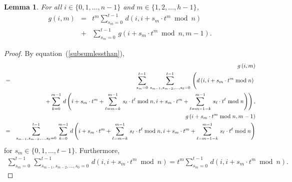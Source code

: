 \documentclass[letterpaper,12pt]{article}
\newtheorem{lemma}[theorem]{Lemma}
\begin{document}
\begin{lemma}
\label{recurrencelemma1}
For all $i\in\{0,1,\ldots,n-1\}$ and $m\in\{1,2,\ldots,h-1\}$,
\begin{eqnarray}
g\left(i,m
\right)
&=&
t^m\sum_{s_m=0}^{t-1}\,
d\left(i,i+s_m\cdot t^m\bmod{n}\right)\nonumber\\
&+&\sum_{s_m=0}^{t-1}\,
g\left(i+s_m\cdot t^m\bmod{n},m-1
\right).
\nonumber
\end{eqnarray}
\end{lemma}
\begin{proof}
By equation~(\ref{subsumlessthan}),
{\footnotesize \begin{eqnarray}
&&g\left(i,m\right)\nonumber\\
&=&
\sum_{s_m=0}^{t-1}\,
\sum_{s_{m-1},s_{m-2},\ldots,s_0=0}^{t-1}\,
\left(d\left(i,i+s_m\cdot t^m\bmod{n}
\right)
\vphantom{\sum_{\ell=m-1-k}^{m-2}\,s_\ell\cdot t^\ell}\right.\nonumber\\
&&\left.
+\sum_{k=0}^{m-1}\,
d\left(i+s_m\cdot t^m+\sum_{\ell=m-k}^{m-1}\,s_\ell\cdot t^\ell
\bmod{n},
i+s_m\cdot t^m+\sum_{\ell=m-1-k}^{m-1}\,s_\ell\cdot t^\ell\bmod{n}
\right)
\right),\nonumber\\
&&g\left(i+s_m\cdot t^m\bmod{n},m-1\right)\nonumber\\
&=&
\sum_{s_{m-1},s_{m-2},\ldots,s_0=0}^{t-1}\,
\sum_{k=0}^{m-1}\,
d\left(i+s_m\cdot t^m+\sum_{\ell=m-k}^{m-1}\,s_\ell\cdot t^\ell
\bmod{n},
i+s_m\cdot t^m+\sum_{\ell=m-1-k}^{m-1}\,s_\ell\cdot t^\ell\bmod{n}
\right)\nonumber
\end{eqnarray}
}for $s_m\in\{0,1,\ldots,t-1\}$.
Furthermore,
\begin{eqnarray}
\sum_{s_m=0}^{t-1}\,
\sum_{s_{m-1},s_{m-2},\ldots,s_0=0}^{t-1}\,
d\left(i,i+s_m\cdot t^m\bmod{n}\right)
=
t^m\sum_{s_m=0}^{t-1}\,
d\left(i,i+s_m\cdot t^m\bmod{n}
\right).
\nonumber
\end{eqnarray}
\end{proof}
\end{document}
